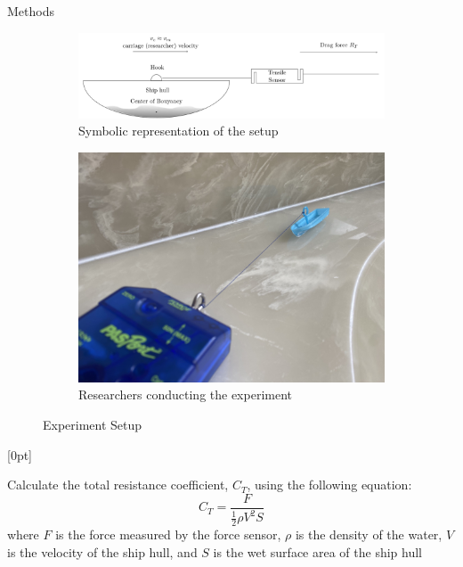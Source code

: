 \documentclass[final, 20pt]{beamer}
\newlength{\colwidth}
\newlength{\twocolwidth}
\begin{document}
\begin{frame}[t]
\begin{columns}[t]
\begin{column}{\twocolwidth}
\begin{block}{Methods}
\begin{multicols}{2}
          \begin{figure}
            \centering
            \begin{subfigure}[b]{0.48\linewidth}
              \centering
              \includegraphics[width=\linewidth]{images/symbolic-setup}
              \caption{Symbolic representation of the setup}
            \end{subfigure}
            \begin{subfigure}[b]{0.48\linewidth}
              \centering
              \includegraphics[width=0.5\linewidth]{images/experiment-setup}
              \caption{Researchers conducting the experiment}
            \end{subfigure}
            \caption{Experiment Setup}
          \end{figure}

          [0pt]

          Calculate the total resistance coefficient, $C_T$, using the following equation:
          \begin{equation}
            \label{eq:ct}
            C_T = \frac{F}{\frac{1}{2} \rho V^2 S}
          \end{equation}
          where $F$ is the force measured by the force sensor, $\rho$ is the density of the water, $V$ is the velocity of the ship hull, and $S$ is the wet surface area of the ship hull
        \end{multicols}
      \end{block}

      \vfill


\end{column}
\end{columns}
\end{frame}
\end{document}
